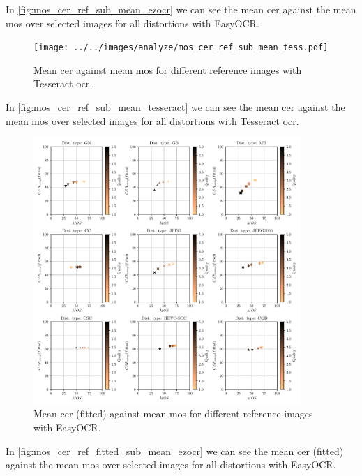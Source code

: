 In \autoref{fig:mos_cer_ref_sub_mean_ezocr} we can see the mean \gls{cer} against the mean \gls{mos} over selected images for all distortions with EasyOCR.

\begin{figure}[h]
\centering
    \texttt{[image: ../../images/analyze/mos\_cer\_ref\_sub\_mean\_tess.pdf]}
    \caption{Mean \gls{cer} against mean \gls{mos} for different reference images with Tesseract \gls{ocr}.}
\label{fig:mos_cer_ref_sub_mean_tesseract}
\end{figure}

In \autoref{fig:mos_cer_ref_sub_mean_tesseract} we can see the mean \gls{cer} against the mean \gls{mos} over selected images for all distortions with Tesseract \gls{ocr}.


\begin{figure}[h]
\centering
    \includegraphics[width=0.9\textwidth]{../../images/analyze/mos_cer_ref_fitted_sub_mean_ezocr.pdf}
    \caption{Mean \gls{cer} (fitted) against mean \gls{mos} for different reference images with EasyOCR.}
\label{fig:mos_cer_ref_fitted_sub_mean_ezocr}
\end{figure}

In \autoref{fig:mos_cer_ref_fitted_sub_mean_ezocr} we can see the mean \gls{cer} (fitted) against the mean \gls{mos} over selected images for all distortions with EasyOCR.

